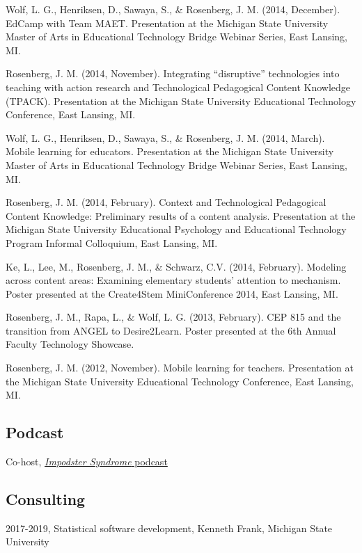 \documentclass[14,]{article}
\begin{document}
Wolf, L. G., Henriksen, D., Sawaya, S., \& Rosenberg, J. M. (2014,
December). EdCamp with Team MAET. Presentation at the Michigan State
University Master of Arts in Educational Technology Bridge Webinar
Series, East Lansing, MI.

Rosenberg, J. M. (2014, November). Integrating ``disruptive''
technologies into teaching with action research and Technological
Pedagogical Content Knowledge (TPACK). Presentation at the Michigan
State University Educational Technology Conference, East Lansing, MI.

Wolf, L. G., Henriksen, D., Sawaya, S., \& Rosenberg, J. M. (2014,
March). Mobile learning for educators. Presentation at the Michigan
State University Master of Arts in Educational Technology Bridge Webinar
Series, East Lansing, MI.

Rosenberg, J. M. (2014, February). Context and Technological Pedagogical
Content Knowledge: Preliminary results of a content analysis.
Presentation at the Michigan State University Educational Psychology and
Educational Technology Program Informal Colloquium, East Lansing, MI.

Ke, L., Lee, M., Rosenberg, J. M., \& Schwarz, C.V. (2014, February).
Modeling across content areas: Examining elementary students' attention
to mechanism. Poster presented at the Create4Stem MiniConference 2014,
East Lansing, MI.

Rosenberg, J. M., Rapa, L., \& Wolf, L. G. (2013, February). CEP 815 and
the transition from ANGEL to Desire2Learn. Poster presented at the 6th
Annual Faculty Technology Showcase.

Rosenberg, J. M. (2012, November). Mobile learning for teachers.
Presentation at the Michigan State University Educational Technology
Conference, East Lansing, MI.

\hypertarget{podcast}{%
\subsection{Podcast}\label{podcast}}

Co-host, \href{http://impodstersyndrome.libsyn.com/}{\emph{Impodster
Syndrome} podcast}

\hypertarget{consulting}{%
\subsection{Consulting}\label{consulting}}

2017-2019, Statistical software development, Kenneth Frank, Michigan
State University
\end{document}
